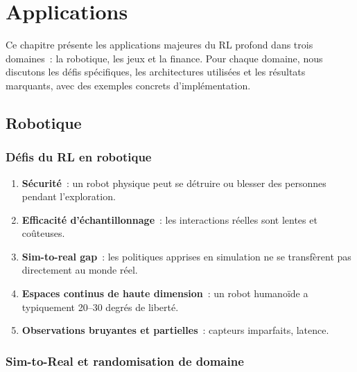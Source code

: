 \chapter{Applications}
\label{ch:applications}

\begin{intuition}
Ce chapitre pr\'esente les applications majeures du RL profond dans trois
domaines~: la robotique, les jeux et la finance. Pour chaque domaine, nous
discutons les d\'efis sp\'ecifiques, les architectures utilis\'ees et les
r\'esultats marquants, avec des exemples concrets d'impl\'ementation.
\end{intuition}

\section{Robotique}

\subsection{D\'efis du RL en robotique}

\begin{attention}[title=\textbf{D\'efis sp\'ecifiques \`a la robotique}]
\begin{enumerate}
    \item \textbf{S\'ecurit\'e}~: un robot physique peut se d\'etruire ou blesser
    des personnes pendant l'exploration.
    \item \textbf{Efficacit\'e d'\'echantillonnage}~: les interactions r\'eelles
    sont lentes et co\^uteuses.
    \item \textbf{Sim-to-real gap}~: les politiques apprises en simulation ne
    se transf\`erent pas directement au monde r\'eel.
    \item \textbf{Espaces continus de haute dimension}~: un robot humano\"ide
    a typiquement 20--30 degr\'es de libert\'e.
    \item \textbf{Observations bruyantes et partielles}~: capteurs imparfaits,
    latence.
\end{enumerate}
\end{attention}

\subsection{Sim-to-Real et randomisation de domaine}


